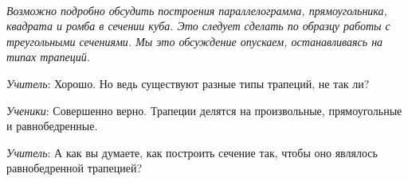 \documentclass[a4paper,14pt,russian]{extreport}
\newcommand{\capt}[1]{%
    \\[8pt]
    \text{Рис. #1}
}
\begin{document}
 \begin{center}
    \begin{minipage}{0.3\textwidth}
        \centering
    \end{minipage}
  \hspace{-0.2cm}
    \begin{minipage}{0.3\textwidth}
        \centering
    \end{minipage}
      \hspace{-0.2cm}
    \begin{minipage}{0.3\textwidth}
        \centering
    \end{minipage}
       \hspace{-0.2cm}
    \begin{minipage}{0.3\textwidth}
        \centering
    \end{minipage}
       \hspace{-0.2cm}
    \begin{minipage}{0.3\textwidth}
        \centering
    \end{minipage}
    \capt{3}
\end{center}

\textit{Возможно подробно обсудить построения параллелограмма, прямоугольника, квадрата и ромба в сечении куба. Это следует сделать по образцу работы с треугольными сечениями. Мы это обсуждение опускаем, останавливаясь на типах трапеций.}

\textit{Учитель}: Хорошо. Но ведь существуют разные типы трапеций, не так ли?

\textit{Ученики}: Совершенно верно. Трапеции делятся на произвольные, прямоугольные и равнобедренные.

\textit{Учитель}: А как вы думаете, как построить сечение так, чтобы оно являлось равнобедренной трапецией?
\end{document}
